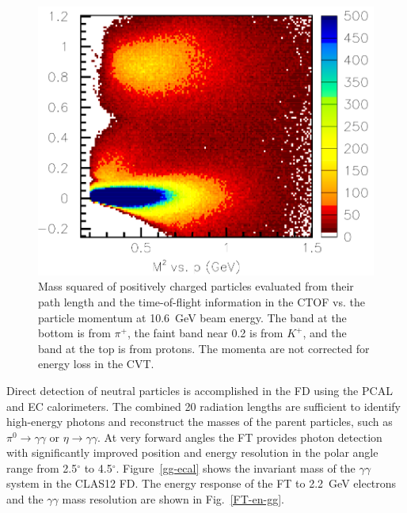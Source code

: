 \documentclass[final,3p,twocolumn]{elsarticle}
\begin{document}
\begin{figure}[t!]
\centerline{\includegraphics[width=1.\columnwidth]{ctof-pid-3.png}}
\caption{Mass squared of positively charged particles evaluated from their path length and the time-of-flight
  information in the CTOF vs. the particle momentum at 10.6~GeV beam energy. The band at the bottom is from
  $\pi^+$, the faint band near 0.2 is from $K^+$, and the band at the top is from protons. The momenta are not
  corrected for energy loss in the CVT.}
\label{CD-PID}
\end{figure} 

Direct detection of neutral particles is accomplished in the FD using the PCAL and EC calorimeters. The combined
20 radiation lengths are sufficient to identify high-energy photons and reconstruct the masses of the parent
particles, such as $\pi^0\to \gamma \gamma$  or $\eta \to \gamma \gamma$. At very forward angles the FT
provides photon detection with significantly improved position and energy resolution in the polar angle range from
2.5$^\circ$ to 4.5$^\circ$. Figure~\ref{gg-ecal} shows the invariant mass of the $\gamma\gamma$ system in the
CLAS12 FD. The energy response of the FT to 2.2~GeV electrons and the $\gamma \gamma$ mass resolution are
shown in Fig.~\ref{FT-en-gg}. 
\end{document}
